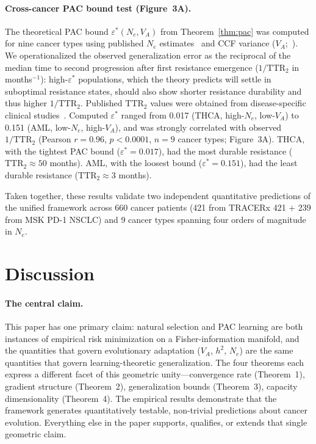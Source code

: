 \documentclass[12pt]{article}
\theoremstyle{remark}
\begin{document}
\paragraph{Cross-cancer PAC bound test (Figure~3A).} The theoretical PAC bound $\varepsilon^*(N_e, V_A)$ from Theorem~\ref{thm:pac} was computed for nine cancer types using published $N_e$ estimates~\cite{williams2016} and CCF variance ($V_A$;~\cite{dentro2021}). We operationalized the observed generalization error as the reciprocal of the median time to second progression after first resistance emergence ($1/\mathrm{TTR}_2$ in months$^{-1}$): high-$\varepsilon^*$ populations, which the theory predicts will settle in suboptimal resistance states, should also show shorter resistance durability and thus higher $1/\mathrm{TTR}_2$. Published $\mathrm{TTR}_2$ values were obtained from disease-specific clinical studies~\cite{shlush2017,omuro2013,wagle2014,yates2015,oxnard2017,hellmann2019,osumi2021,scher2012,haugen2016}. Computed $\varepsilon^*$ ranged from 0.017 (THCA, high-$N_e$, low-$V_A$) to 0.151 (AML, low-$N_e$, high-$V_A$), and was strongly correlated with observed $1/\mathrm{TTR}_2$ (Pearson $r = 0.96$, $p < 0.0001$, $n = 9$ cancer types; Figure~3A). THCA, with the tightest PAC bound ($\varepsilon^* = 0.017$), had the most durable resistance ($\mathrm{TTR}_2 \approx 50$ months). AML, with the loosest bound ($\varepsilon^* = 0.151$), had the least durable resistance ($\mathrm{TTR}_2 \approx 3$ months).

Taken together, these results validate two independent quantitative predictions of the unified framework across 660 cancer patients (421 from TRACERx 421 + 239 from MSK PD-1 NSCLC) and 9 cancer types spanning four orders of magnitude in $N_e$.

\section{Discussion}

\paragraph{The central claim.} This paper has one primary claim: natural selection and PAC learning are both instances of empirical risk minimization on a Fisher-information manifold, and the quantities that govern evolutionary adaptation ($V_A$, $h^2$, $N_e$) are the same quantities that govern learning-theoretic generalization. The four theorems each express a different facet of this geometric unity---convergence rate (Theorem~1), gradient structure (Theorem~2), generalization bounds (Theorem~3), capacity dimensionality (Theorem~4). The empirical results demonstrate that the framework generates quantitatively testable, non-trivial predictions about cancer evolution. Everything else in the paper supports, qualifies, or extends that single geometric claim.
\end{document}
